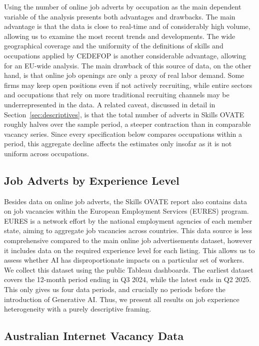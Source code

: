 \documentclass[11pt]{article}
\begin{document}
Using the number of online job adverts by occupation as the main dependent variable of the analysis presents both advantages and drawbacks. The main advantage is that the data is close to real-time and of considerably high volume, allowing us to examine the most recent trends and developments. The wide geographical coverage and the uniformity of the definitions of skills and occupations applied by CEDEFOP is another considerable advantage, allowing for an EU-wide analysis. The main drawback of this source of data, on the other hand, is that online job openings are only a proxy of real labor demand. Some firms may keep open positions even if not actively recruiting, while entire sectors and occupations that rely on more traditional recruiting channels may be underrepresented in the data. A related caveat, discussed in detail in Section~\ref{sec:descriptives}, is that the total number of adverts in Skills OVATE roughly halves over the sample period, a steeper contraction than in comparable vacancy series. Since every specification below compares occupations within a period, this aggregate decline affects the estimates only insofar as it is not uniform across occupations.

\subsection{Job Adverts by Experience Level}

Besides data on online job adverts, the Skills OVATE report also contains data on job vacancies within the European Employment Services (EURES) program. EURES is a network effort by the national employment agencies of each member state, aiming to aggregate job vacancies across countries. This data source is less comprehensive compared to the main online job advertisements dataset, however it includes data on the required experience level for each listing. This allows us to assess whether AI has disproportionate impacts on a particular set of workers. We collect this dataset using the public Tableau dashboards. The earliest dataset covers the 12-month period ending in Q3 2024, while the latest ends in Q2 2025. This only gives us four data periods, and crucially no periods before the introduction of Generative AI. Thus, we present all results on job experience heterogeneity with a purely descriptive framing.

\subsection{Australian Internet Vacancy Data}
\end{document}

